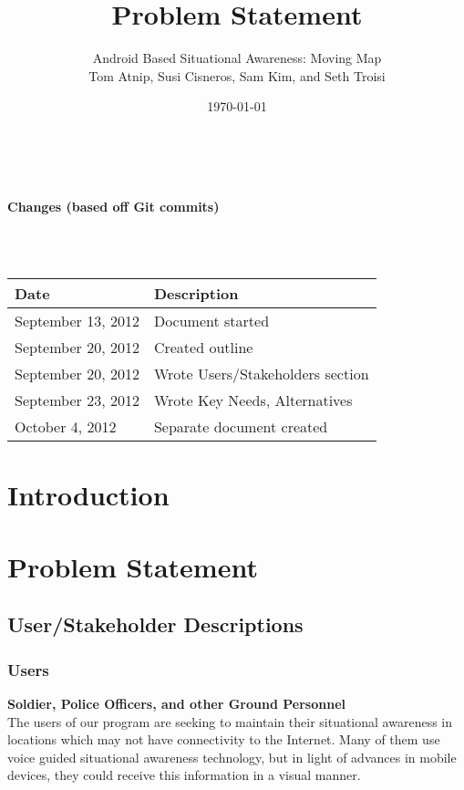 \documentclass{article}
\begin{document}
\setlength{\voffset}{3.5in}
\title{Problem Statement}
\author{\Large Android Based Situational Awareness: Moving Map\\
Tom Atnip, Susi Cisneros, Sam Kim, and Seth Troisi}
\date{\today}
\maketitle
\clearpage
\setlength{\voffset}{0pt}
\tableofcontents
\clearpage
~\\
\begin{Large}\textbf{Changes (based off Git commits)}\end{Large}\\
~\\
\begin{tabular}{ | p{1.5in} | p{4.5in} | }
\hline
\textbf{Date} & \textbf{Description}\\
\hline
\hline
September 13, 2012 & Document started\\
\hline
September 20, 2012 & Created outline\\
\hline
September 20, 2012 & Wrote Users/Stakeholders section\\
\hline
September 23, 2012 & Wrote Key Needs, Alternatives\\
\hline
October 4, 2012 & Separate document created\\
\hline
\end{tabular}
\clearpage

\section{Introduction}

\section{Problem Statement}
\subsection{User/Stakeholder Descriptions}
\subsubsection{Users} 
\textbf{Soldier, Police Officers, and other Ground Personnel}\\
The users of our program are seeking to maintain their situational awareness in locations which may not have connectivity to the Internet.  Many of them use voice guided situational awareness technology, but in light of advances in mobile devices, they could receive this information in a visual manner.  
\end{document}
